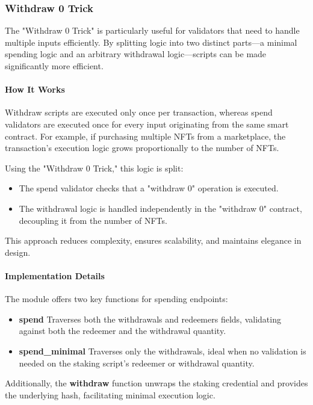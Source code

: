 \subsubsection{Withdraw 0 Trick}

The "Withdraw 0 Trick" is particularly useful for validators that need to handle multiple inputs efficiently. By splitting logic into two distinct parts—a minimal spending logic and an arbitrary withdrawal logic—scripts can be made significantly more efficient. 

\paragraph{How It Works}

Withdraw scripts are executed only once per transaction, whereas spend validators are executed once for every input originating from the same smart contract. For example, if purchasing multiple NFTs from a marketplace, the transaction's execution logic grows proportionally to the number of NFTs.

Using the "Withdraw 0 Trick," this logic is split:
\begin{itemize}
    \item The spend validator checks that a "withdraw 0" operation is executed.
    \item The withdrawal logic is handled independently in the "withdraw 0" contract, decoupling it from the number of NFTs.
\end{itemize}

This approach reduces complexity, ensures scalability, and maintains elegance in design.

\paragraph{Implementation Details}

The module offers two key functions for spending endpoints:
\begin{itemize}
    \item \textbf{spend} \textendash{} Traverses both the withdrawals and redeemers fields, validating against both the redeemer and the withdrawal quantity.
    \item \textbf{spend\_minimal} \textendash{} Traverses only the withdrawals, ideal when no validation is needed on the staking script's redeemer or withdrawal quantity.
\end{itemize}

Additionally, the \textbf{withdraw} function unwraps the staking credential and provides the underlying hash, facilitating minimal execution logic.

